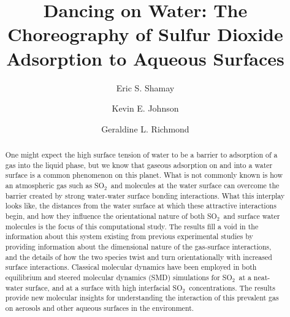 \documentclass{article}
\title{Dancing on Water: The Choreography of Sulfur Dioxide Adsorption to Aqueous Surfaces}
\author{Eric S. Shamay \and Kevin E. Johnson \and Geraldine L. Richmond}
\begin{document}
\newcommand{\suldiox}{SO$_2$}
\newcommand{\ang}{\,$\textrm{\AA}$}
\newcommand{\angs}{\ang}
\newcommand{\wat}{H$_2$O}

\maketitle

\linenumbers 
\doublespacing


\begin{abstract}
One might expect the high surface tension of water to be a barrier to adsorption of a gas into the liquid phase, but we know that gaseous adsorption on and into a water surface is a common phenomenon on this planet.  What is not commonly known is how an atmospheric gas such as \suldiox~and molecules at the water surface can overcome the barrier created by strong water-water surface bonding interactions.  What this interplay looks like, the distances from the water surface at which these attractive interactions begin, and how they influence the orientational nature of both \suldiox~and surface water molecules is the focus of this computational study.  The results fill a void in the information about this system existing from previous experimental studies by providing information about the dimensional nature of the gas-surface interactions, and the details of how the two species twist and turn orientationally with increased surface interactions.  Classical molecular dynamics have been employed in both equilibrium and steered molecular dynamics (SMD) simulations for \suldiox~at a neat-water surface, and at a surface with high interfacial \suldiox~concentrations.  The results provide new molecular insights for understanding the interaction of this prevalent gas on aerosols and other aqueous surfaces in the environment.
\end{abstract}







\end{document}
